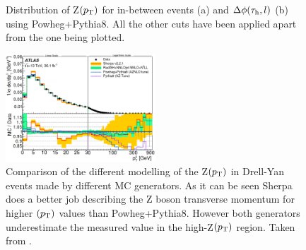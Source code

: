 \begin{figure}[H]
	\centering
	\hfill
	\caption{Distribution of Z$(p_\text{T})$ for in-between events (a) and $\Delta\phi(\tau_\text{h},l)$ (b) using Powheg+Pythia8. All the other cuts have been applied apart from the one being plotted.}
	\label{Fig23}
\end{figure}
\begin{figure}[H]
	\centering
	\includegraphics[width=0.5\textwidth]{figures/Fig20}
	\caption{Comparison of the different modelling of the Z$(p_\text{T})$ in Drell-Yan events made by different MC generators. As it can be seen Sherpa does a better job describing the Z boson transverse momentum for higher $(p_\text{T})$ values than Powheg+Pythia8. However both generators underestimate the measured value in the high-Z$(p_\text{T})$ region. Taken from \cite{Aad:2019wmn}.}
	\label{Fig20}
\end{figure}

